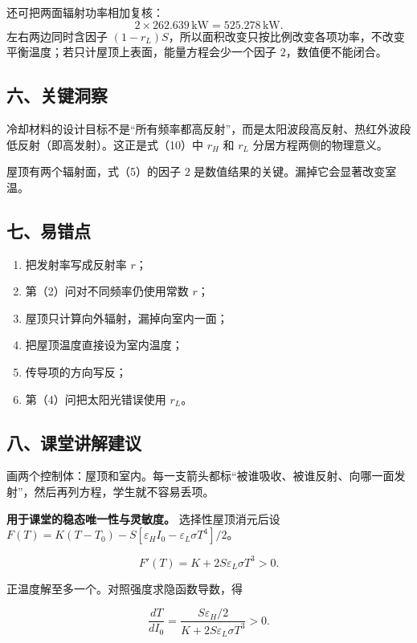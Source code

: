 \documentclass[12pt,a4paper,UTF8]{ctexart}
\newcommand{\tightlist}{\setlength{\itemsep}{0pt}\setlength{\parskip}{0pt}}
\begin{document}
还可把两面辐射功率相加复核： \[
2\times262.639\,\mathrm{kW}
=525.278\,\mathrm{kW}.
\] 左右两边同时含因子
\((1-r_L)S\)，所以面积改变只按比例改变各项功率，不改变平衡温度；若只计屋顶上表面，能量方程会少一个因子
\(2\)，数值便不能闭合。

\subsection{六、关键洞察}\label{ux516dux5173ux952eux6d1eux5bdf-6}

冷却材料的设计目标不是``所有频率都高反射''，而是太阳波段高反射、热红外波段低反射（即高发射）。这正是式（10）中
\(r_H\) 和 \(r_L\) 分居方程两侧的物理意义。

屋顶有两个辐射面，式（5）的因子 \(2\)
是数值结果的关键。漏掉它会显著改变室温。

\subsection{七、易错点}\label{ux4e03ux6613ux9519ux70b9-6}

\begin{enumerate}
\def\labelenumi{\arabic{enumi}.}
\tightlist
\item
  把发射率写成反射率 \(r\)；
\item
  第（2）问对不同频率仍使用常数 \(r\)；
\item
  屋顶只计算向外辐射，漏掉向室内一面；
\item
  把屋顶温度直接设为室内温度；
\item
  传导项的方向写反；
\item
  第（4）问把太阳光错误使用 \(r_L\)。
\end{enumerate}

\subsection{八、课堂讲解建议}\label{ux516bux8bfeux5802ux8bb2ux89e3ux5efaux8bae-6}

画两个控制体：屋顶和室内。每一支箭头都标``被谁吸收、被谁反射、向哪一面发射''，然后再列方程，学生就不容易丢项。

\textbf{用于课堂的稳态唯一性与灵敏度。}
选择性屋顶消元后设\(F(T)=K(T-T_0)-S[\varepsilon_HI_0-\varepsilon_L\sigma T^4]/2\)。

\[F'(T)=K+2S\varepsilon_L\sigma T^3>0.\]

正温度解至多一个。对照强度求隐函数导数，得

\[\frac{dT}{dI_0}=\frac{S\varepsilon_H/2}{K+2S\varepsilon_L\sigma T^3}>0.\]
\end{document}
